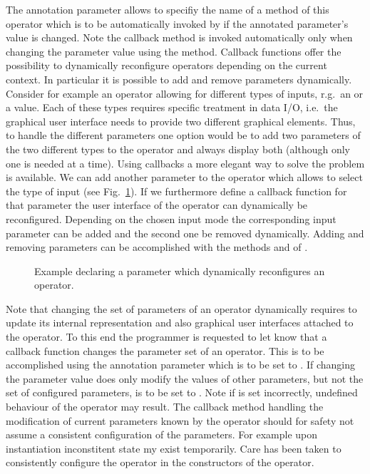 The annotation parameter  allows to specifiy the name of a method of this operator
which is to be automatically invoked by \alida if the annotated parameter's value is changed.
Note the callback method is invoked automatically only when changing the
parameter value using the  method. Callback functions offer the possibility to
dynamically reconfigure operators depending on the current context. In particular it is possible to
add and remove parameters dynamically. Consider for example an operator allowing for different types
of inputs, r.g.~an  or a  value. Each of these types requires specific treatment in data
I/O, i.e.~the graphical user interface needs to provide two different graphical elements. Thus,
to handle the different parameters one option would be to add two parameters of the two different
types to the operator and always display both (although only one is needed at a time). Using
callbacks a more elegant way to solve the problem is available. We can add another parameter
 to the operator which allows to select the type of input
(see Fig.~\ref{exa:callback-define}). If we furthermore
define a callback function for that parameter the user interface of the operator can dynamically be
reconfigured. Depending on the chosen input mode the corresponding input parameter can be added
and the second one be removed dynamically. Adding and removing parameters can be accomplished with
the methods  and  of .

\begin{figure}[h]

\caption{\label{exa:callback-define}Example declaring a parameter which dynamically reconfigures an operator.}
\end{figure}


Note that changing the set of parameters of an operator
dynamically requires \alida to update its internal representation and also graphical user interfaces
attached to the operator. To this end the programmer is requested to let \alida know that a callback
function changes the parameter set of an operator. This is to be accomplished using the
annotation parameter  which is to be set to .
If changing the parameter value does only modify the values of other parameters,
but not the set of configured parameters,
  is to be set to .
Note if  is set incorrectly,
undefined behaviour of the operator may result.
The callback method handling the modification of current parameters known by the operator
should for safety not assume a consistent configuration of the parameters.
For example upon instantiation inconstitent state my exist temporarily.
Care has been taken to consistently configure the operator in the constructors of the operator.

